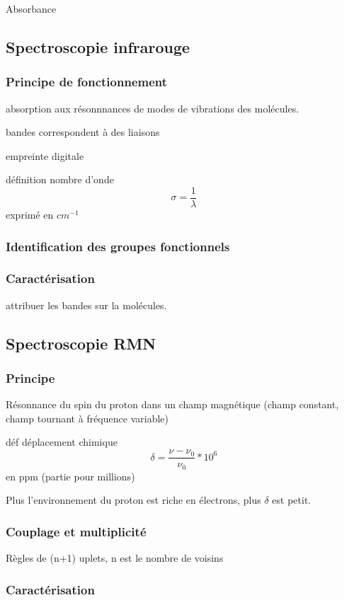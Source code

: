 \documentclass{article}%
\begin{document}
Absorbance
\subsection{Spectroscopie infrarouge}
\subsubsection{Principe de fonctionnement}

absorption aux résonnnances de modes de vibrations des molécules.

bandes correspondent à des liaisons

empreinte digitale

définition nombre d'onde \[\sigma=\frac{1}{\lambda}\] exprimé en $cm^{-1}$

\subsubsection{Identification des groupes fonctionnels}



\subsubsection{Caractérisation}

attribuer les bandes sur la molécules.

\subsection{Spectroscopie RMN}
\subsubsection{Principe}

Résonnance du spin du proton dans un champ magnétique (champ constant, champ tournant à fréquence variable)

déf déplacement chimique \[\delta = \frac{\nu -\nu_0}{\nu_0} * 10^6\] en ppm (partie pour millions)

Plus l'environnement du proton est riche en électrons, plus $\delta$ est petit.

\subsubsection{Couplage et multiplicité}

Règles de (n+1) uplets, n est le nombre de voisins

\subsubsection{Caractérisation}
\end{document}
